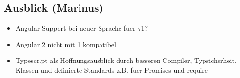 \subsection{Ausblick (Marinus)}\label{ausblick-marinus}

\begin{itemize}
\itemsep1pt\parskip0pt
\item
  Angular Support bei neuer Sprache fuer v1?
\item
  Angular 2 nicht mit 1 kompatibel
\item
  Typescript als Hoffnungsausblick durch besseren Compiler,
  Typsicherheit, Klassen und definierte Standards z.B. fuer Promises und
  require
\end{itemize}
